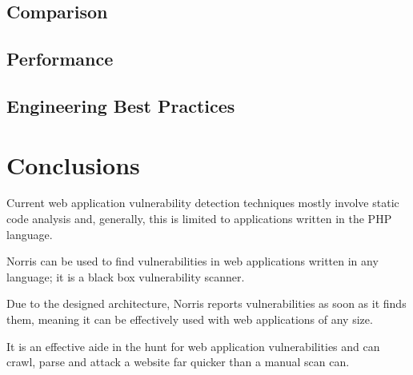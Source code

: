\documentclass[12pt,a4paper]{article}
\begin{document}
\subsection{Comparison}

\subsection{Performance}

\subsection{Engineering Best Practices}

\section{Conclusions}

Current web application vulnerability detection techniques mostly involve static code analysis and, generally, this is limited to applications written in the PHP language.

Norris can be used to find vulnerabilities in web applications written in any language; it is a black box vulnerability scanner. 

Due to the designed architecture, Norris reports vulnerabilities as soon as it finds them, meaning it can be effectively used with web applications of any size.

It is an effective aide in the hunt for web application vulnerabilities and can crawl, parse and attack a website far quicker than a manual scan can.


\end{document}
